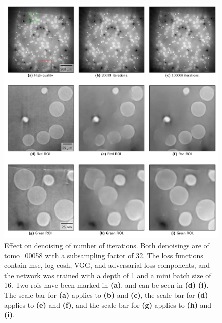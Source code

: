 \begin{figure}[htbp]
  \centering
  \includegraphics[width=.85\textwidth]{figures/iterationdenoisingcomparison.pdf}
  \caption[Effect on denoising of number of iterations]{Effect on denoising of number of iterations. Both denoisings are of tomo\_00058 with a subsampling factor of 32. The loss functions contain \gls{mse}, log-cosh, VGG, and adversarial loss components, and the network was trained with a depth of 1 and a mini batch size of 16. Two \gls{roi}s have been marked in \textbf{(a)}, and can be seen in \textbf{(d)}-\textbf{(i)}. The scale bar for \textbf{(a)} applies to \textbf{(b)} and \textbf{(c)}, the scale bar for \textbf{(d)} applies to \textbf{(e)} and \textbf{(f)}, and the scale bar for \textbf{(g)} applies to \textbf{(h)} and \textbf{(i)}. }
  \label{fig:iterationdenoisingcomparison}
\end{figure}

